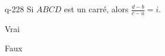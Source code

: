 \begin{truefalse}{q-228}
Si $ABCD$ est un carré, alors $\frac{d-b}{c-a} =i$.
\item Vrai
\item* Faux
\end{truefalse}

